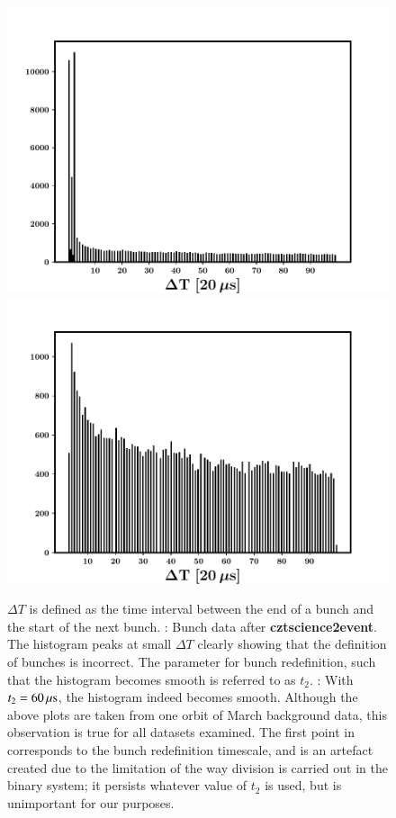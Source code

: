 \begin{figure}
\begin{center}
\includegraphics[scale=0.42]{GRB160802A--Q3--Interval_between_Bunches_Histogram--raw_data}
\includegraphics[scale=0.42]{GRB160802A--Q3--Interval_between_Bunches_Histogram--after_bunch_redefinition}
\caption[The re-definition of bunches]{$\Delta T$ is defined as the time interval between the end of a bunch and the start of the next bunch. \eL: Bunch data after \textbf{cztscience2event}. The histogram peaks at small $\Delta T$ clearly showing that the definition of bunches is incorrect. The parameter for bunch redefinition, such that the histogram becomes smooth is referred to as $t_2$. \eR: With $t_2 = 60 \, {\rm \mu s}$, the histogram indeed becomes smooth. Although the above plots are taken from one orbit of March background data, this observation is true for all datasets examined. The first point in corresponds to the bunch redefinition timescale, and is an artefact created due to the limitation of the way division is carried out in the binary system; it persists whatever value of $t_2$ is used, but is unimportant for our purposes.}
\label{fig:bunch_redefinition}
\end{center}
\end{figure}

